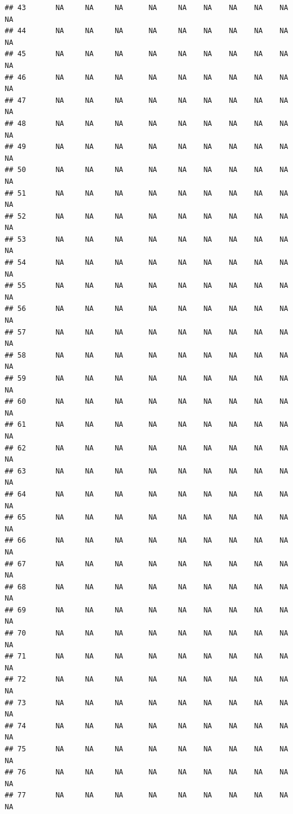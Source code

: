 \documentclass{article}\usepackage{graphicx, color}
\makeatletter
\newenvironment{kframe}{%
 \def\at@end@of@kframe{}%
 \ifinner\ifhmode%
  \def\at@end@of@kframe{\end{minipage}}%
  \begin{minipage}{\columnwidth}%
 \fi\fi%
 \def\FrameCommand##1{\hskip\@totalleftmargin \hskip-\fboxsep
 \colorbox{shadecolor}{##1}\hskip-\fboxsep
     \hskip-\linewidth \hskip-\@totalleftmargin \hskip\columnwidth}%
 \MakeFramed {\advance\hsize-\width
   \@totalleftmargin\z@ \linewidth\hsize
   \@setminipage}}%
 {\par\unskip\endMakeFramed%
 \at@end@of@kframe}
\newenvironment{knitrout}{}{} %
\makeatother
\begin{document}
\begin{knitrout}
\begin{kframe}
\begin{verbatim}
## 43       NA     NA     NA      NA     NA    NA    NA    NA    NA     NA
## 44       NA     NA     NA      NA     NA    NA    NA    NA    NA     NA
## 45       NA     NA     NA      NA     NA    NA    NA    NA    NA     NA
## 46       NA     NA     NA      NA     NA    NA    NA    NA    NA     NA
## 47       NA     NA     NA      NA     NA    NA    NA    NA    NA     NA
## 48       NA     NA     NA      NA     NA    NA    NA    NA    NA     NA
## 49       NA     NA     NA      NA     NA    NA    NA    NA    NA     NA
## 50       NA     NA     NA      NA     NA    NA    NA    NA    NA     NA
## 51       NA     NA     NA      NA     NA    NA    NA    NA    NA     NA
## 52       NA     NA     NA      NA     NA    NA    NA    NA    NA     NA
## 53       NA     NA     NA      NA     NA    NA    NA    NA    NA     NA
## 54       NA     NA     NA      NA     NA    NA    NA    NA    NA     NA
## 55       NA     NA     NA      NA     NA    NA    NA    NA    NA     NA
## 56       NA     NA     NA      NA     NA    NA    NA    NA    NA     NA
## 57       NA     NA     NA      NA     NA    NA    NA    NA    NA     NA
## 58       NA     NA     NA      NA     NA    NA    NA    NA    NA     NA
## 59       NA     NA     NA      NA     NA    NA    NA    NA    NA     NA
## 60       NA     NA     NA      NA     NA    NA    NA    NA    NA     NA
## 61       NA     NA     NA      NA     NA    NA    NA    NA    NA     NA
## 62       NA     NA     NA      NA     NA    NA    NA    NA    NA     NA
## 63       NA     NA     NA      NA     NA    NA    NA    NA    NA     NA
## 64       NA     NA     NA      NA     NA    NA    NA    NA    NA     NA
## 65       NA     NA     NA      NA     NA    NA    NA    NA    NA     NA
## 66       NA     NA     NA      NA     NA    NA    NA    NA    NA     NA
## 67       NA     NA     NA      NA     NA    NA    NA    NA    NA     NA
## 68       NA     NA     NA      NA     NA    NA    NA    NA    NA     NA
## 69       NA     NA     NA      NA     NA    NA    NA    NA    NA     NA
## 70       NA     NA     NA      NA     NA    NA    NA    NA    NA     NA
## 71       NA     NA     NA      NA     NA    NA    NA    NA    NA     NA
## 72       NA     NA     NA      NA     NA    NA    NA    NA    NA     NA
## 73       NA     NA     NA      NA     NA    NA    NA    NA    NA     NA
## 74       NA     NA     NA      NA     NA    NA    NA    NA    NA     NA
## 75       NA     NA     NA      NA     NA    NA    NA    NA    NA     NA
## 76       NA     NA     NA      NA     NA    NA    NA    NA    NA     NA
## 77       NA     NA     NA      NA     NA    NA    NA    NA    NA     NA

\end{verbatim}
\end{kframe}
\end{knitrout}
\end{document}
